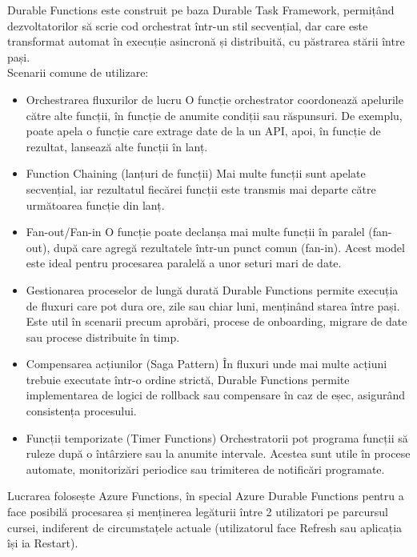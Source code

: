 Durable Functions este construit pe baza Durable Task Framework, permițând dezvoltatorilor să scrie cod orchestrat într-un stil secvențial, dar care este transformat automat în execuție asincronă și distribuită, cu păstrarea stării între pași. \parencite{azureDurableFunctions}
\\Scenarii comune de utilizare:
\begin{itemize}
    \item Orchestrarea fluxurilor de lucru
          O funcție orchestrator coordonează apelurile către alte funcții, în funcție de anumite condiții sau răspunsuri. De exemplu, poate apela o funcție care extrage date de la un API, apoi, în funcție de rezultat, lansează alte funcții în lanț.
    \item 	Function Chaining (lanțuri de funcții)
          Mai multe funcții sunt apelate secvențial, iar rezultatul fiecărei funcții este transmis mai departe către următoarea funcție din lanț.
    \item 	Fan-out/Fan-in
          O funcție poate declanșa mai multe funcții în paralel (fan-out), după care agregă rezultatele într-un punct comun (fan-in). Acest model este ideal pentru procesarea paralelă a unor seturi mari de date.
    \item 	Gestionarea proceselor de lungă durată
          Durable Functions permite execuția de fluxuri care pot dura ore, zile sau chiar luni, menținând starea între pași. Este util în scenarii precum aprobări, procese de onboarding, migrare de date sau procese distribuite în timp.
    \item 	Compensarea acțiunilor (Saga Pattern)
          În fluxuri unde mai multe acțiuni trebuie executate într-o ordine strictă, Durable Functions permite implementarea de logici de rollback sau compensare în caz de eșec, asigurând consistența procesului.
    \item 	Funcții temporizate (Timer Functions)
          Orchestratorii pot programa funcții să ruleze după o întârziere sau la anumite intervale. Acestea sunt utile în procese automate, monitorizări periodice sau trimiterea de notificări programate.
\end{itemize}\parencite{azureDurableFunctions}

Lucrarea folosește Azure Functions, în special Azure Durable Functions pentru a face posibilă procesarea și menținerea legăturii între 2 utilizatori pe parcursul cursei, indiferent de circumstațele actuale (utilizatorul face Refresh sau aplicația își ia Restart).

